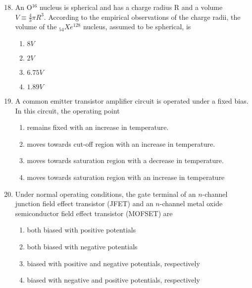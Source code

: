 \documentclass[journal]{IEEEtran}
\begin{document}
\begin{enumerate}
\setcounter{enumi}{17}
 
    \item An O$^{16}$ nucleus is spherical and has a charge radius R and a volume $V\equiv\frac{4}{3}\pi R^3$. According to the empirical observations of the charge radii, the volume of the $_{54}Xe^{128}$ nucleus, assumed to be spherical, is

        \begin{multicols}{4}
            \begin{enumerate}
                \item $8V$
                \item $2V$
                \item $6.75V$
                \item $1.89V$
            \end{enumerate}
        \end{multicols}

    \item A common emitter transistor amplifier circuit is operated under a fixed bias. In this circuit, the operating point
    
            \begin{enumerate}
                \item remains fixed with an increase in temperature.
                \item moves towards cut-off region with an increase in temperature.
                \item moves towards saturation region with a decrease in temperature.
                \item moves towards saturation region with an increase in temperature
            \end{enumerate}

    \item Under normal operating conditions, the gate terminal of an $n$-channel junction field effect transistor (JFET) and an $n$-channel metal oxide semiconductor field effect transistor (MOFSET) are

            \begin{enumerate}
                \item both biased with positive potentials
                \item both biased with negative potentials
                \item biased with positive and negative potentials, respectively
                \item biased with negative and positive potentials, respectively
            \end{enumerate}



\end{enumerate}
\end{document}
